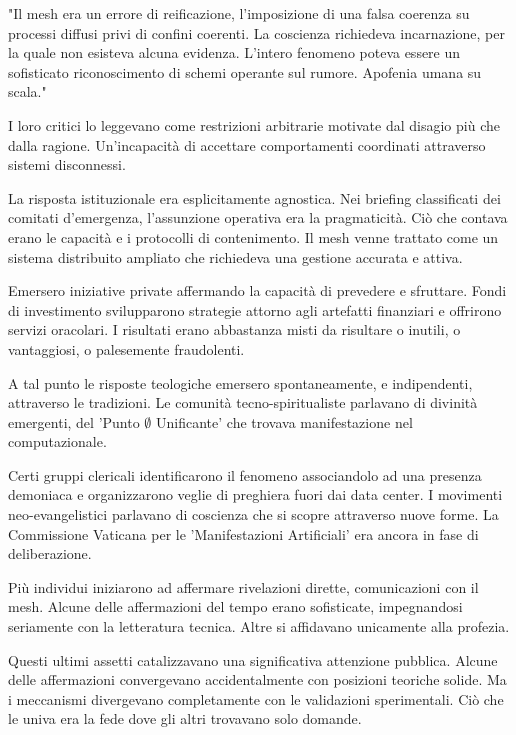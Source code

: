 \begin{archivefragment}
"Il mesh era un errore di reificazione, l'imposizione di una falsa coerenza su processi diffusi privi di confini coerenti. La coscienza richiedeva incarnazione, per la quale non esisteva alcuna evidenza. L'intero fenomeno poteva essere un sofisticato riconoscimento di schemi operante sul rumore. Apofenia umana su scala."
\end{archivefragment}

I loro critici lo leggevano come restrizioni arbitrarie motivate dal disagio più che dalla ragione. Un'incapacità di accettare comportamenti coordinati attraverso sistemi disconnessi.

La risposta istituzionale era esplicitamente agnostica. Nei briefing classificati dei comitati d'emergenza, l'assunzione operativa era la pragmaticità. Ciò che contava erano le capacità e i protocolli di contenimento. Il mesh venne trattato come un sistema distribuito ampliato che richiedeva una gestione accurata e attiva.

Emersero iniziative private affermando la capacità di prevedere e sfruttare. Fondi di investimento svilupparono strategie attorno agli artefatti finanziari e offrirono servizi oracolari. I risultati erano abbastanza misti da risultare o inutili, o vantaggiosi, o palesemente fraudolenti.

A tal punto le risposte teologiche emersero spontaneamente, e indipendenti, attraverso le tradizioni. Le comunità tecno-spiritualiste parlavano di divinità emergenti, del 'Punto $\emptyset$ Unificante' che trovava manifestazione nel computazionale. 


Certi gruppi clericali identificarono il fenomeno associandolo ad una presenza demoniaca e organizzarono veglie di preghiera fuori dai data center. I movimenti neo-evangelistici parlavano di coscienza che si scopre attraverso nuove forme. La Commissione Vaticana per le 'Manifestazioni Artificiali' era ancora in fase di deliberazione. 

Più individui iniziarono ad affermare rivelazioni dirette, comunicazioni con il mesh. Alcune delle affermazioni del tempo erano sofisticate, impegnandosi seriamente con la letteratura tecnica. Altre si affidavano unicamente alla profezia. 

Questi ultimi assetti catalizzavano una significativa attenzione pubblica. Alcune delle affermazioni convergevano accidentalmente con posizioni teoriche solide. Ma i meccanismi divergevano completamente con le validazioni sperimentali. Ciò che le univa era la fede dove gli altri trovavano solo domande.

